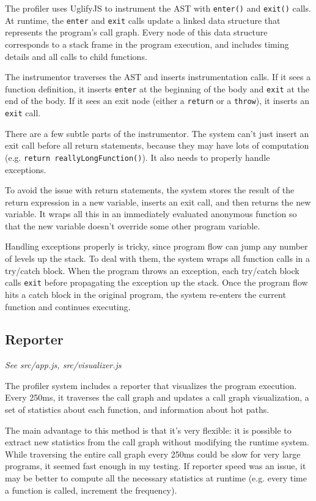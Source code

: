 \documentclass{article}
\begin{document}
The profiler uses UglifyJS \cite{uglify} to instrument the AST with \texttt{enter()} and \texttt{exit()} calls. At runtime, the \texttt{enter} and \texttt{exit} calls update a linked data structure that represents the program's call graph. Every node of this data structure corresponds to a stack frame in the program execution, and includes timing details and all calls to child functions.

The instrumentor traverses the AST and inserts instrumentation calls. If it sees a function definition, it inserts \texttt{enter} at the beginning of the body and \texttt{exit} at the end of the body. If it sees an exit node (either a \texttt{return} or a \texttt{throw}), it inserts an \texttt{exit} call.

There are a few subtle parts of the instrumentor. The system can't just insert an exit call before all return statements, because they may have lots of computation (e.g. \texttt{return reallyLongFunction()}). It also needs to properly handle exceptions.

To avoid the issue with return statements, the system stores the result of the return expression in a new variable, inserts an exit call, and then returns the new variable. It wraps all this in an immediately evaluated anonymous function so that the new variable doesn't override some other program variable.

Handling exceptions properly is tricky, since program flow can jump any number of levels up the stack. To deal with them, the system wraps all function calls in a try/catch block. When the program throws an exception, each try/catch block calls \texttt{exit} before propagating the exception up the stack. Once the program flow hits a catch block in the original program, the system re-enters the current function and continues executing.

\subsection*{Reporter}

\textit{See src/app.js, src/visualizer.js}

The profiler system includes a reporter that visualizes the program execution. Every 250ms, it traverses the call graph and updates a call graph visualization, a set of statistics about each function, and information about hot paths.

The main advantage to this method is that it's very flexible: it is possible to extract new statistics from the call graph without modifying the runtime system. While traversing the entire call graph every 250ms could be slow for very large programs, it seemed fast enough in my testing. If reporter speed was an issue, it may be better to compute all the necessary statistics at runtime (e.g. every time a function is called, increment the frequency). 
\end{document}
